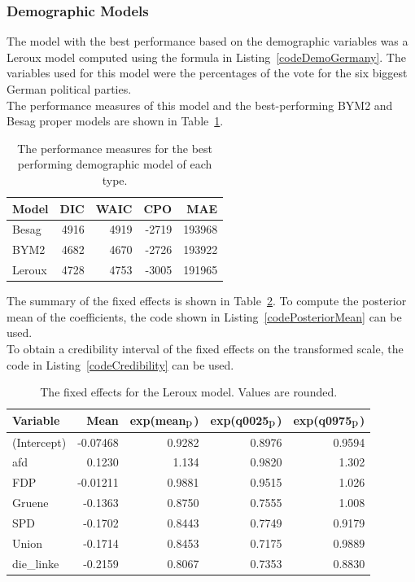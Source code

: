 \subsubsection{Demographic Models}\label{sssec:demoGermany}
The model with the best performance based on the demographic variables was a Leroux model computed using the formula in Listing~\ref{codeDemoGermany}. The variables used for this model were the percentages of the vote for the six biggest German political parties. \\
The performance measures of this model and the best-performing BYM2 and Besag proper models are shown in Table~\ref{demoGermany}. 
\begin{table}[H] 
\caption{The performance measures for the best performing demographic model of each type. \label{demoGermany}}
\begin{tabular}{l r r r r}
\toprule
\textbf{Model}	& \textbf{DIC}	& \textbf{WAIC} & \textbf{CPO} & \textbf{MAE}\\
\midrule
Besag  & 4916 & 4919 & -2719 &  193968 \\
BYM2 & 4682 & 4670 & -2726 &  193922\\
Leroux & 4728  & 4753 & -3005 & 191965\\
\bottomrule
\end{tabular}
\end{table}
The summary of the fixed effects is shown in Table~\ref{fixedDemoGermany}. To compute the posterior mean of the coefficients, the code shown in Listing~\ref{codePosteriorMean} can be used. \\
To obtain a credibility interval of the fixed effects on the transformed scale, the code in Listing~\ref{codeCredibility} can be used. \\
\begin{table}[H] 
\caption{The fixed effects for the Leroux model. Values are rounded. \label{fixedDemoGermany}}
\begin{tabular}{l r r r r}
\toprule
\textbf{Variable}	& \textbf{Mean}	& \textbf{exp(mean$_{\hbox{p}}$)} & \textbf{exp(q0025$_{\hbox{p}}$)} & \textbf{exp(q0975$_{\hbox{p}}$)} \\
\midrule
(Intercept) & -0.07468 & 0.9282 & 0.8976 & 0.9594 \\
afd & 0.1230 & 1.134& 0.9820 & 1.302 \\
FDP & -0.01211 & 0.9881& 0.9515 & 1.026 \\
Gruene & -0.1363 & 0.8750& 0.7555 & 1.008 \\
SPD & -0.1702 & 0.8443 & 0.7749 & 0.9179 \\
Union & -0.1714 & 0.8453& 0.7175 & 0.9889 \\
die\_linke & -0.2159 & 0.8067 & 0.7353 & 0.8830 \\
\bottomrule
\end{tabular}
\end{table}
